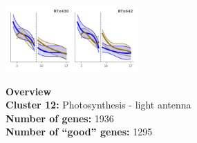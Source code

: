 \begin{multicols}{2}
\includegraphics[width=2in]{figures/clusters/leaf_Preflowering_11.png}
\columnbreak

\noindent \textbf{Overview}\\\textbf{Cluster 12:} Photosynthesis - light antenna \\
\textbf{Number of genes:} 1936 \\
\textbf{Number of ``good'' genes:} 1295 \\
\end{multicols}

